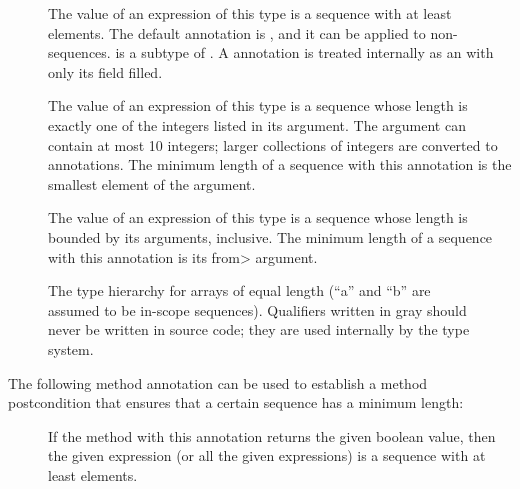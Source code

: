 \begin{description}
\item[]
  The value of an expression of this type is a sequence with at least
   elements.  The default annotation is
  , and it can be applied to non-sequences.
   is a subtype of .
  A  annotation is treated internally as an
   with only its
   field filled.
\item[]
  The value of an expression of this type is a sequence whose
  length is exactly one of the integers listed in its argument.
  The argument can contain at most 10 integers; larger collections of
  integers are converted to 
  annotations. The minimum length of a sequence with this annotation
  is the smallest element of the argument.
\item[]
  The value of an expression of this type is a sequence whose
  length is bounded by its arguments, inclusive.
  The minimum length of a sequence with this annotation is its \<from> argument.
\end{description}

\begin{figure}
\begin{center}
  \hfill
  \hfill
\end{center}
  \caption{The type hierarchy for arrays of equal length (``a'' and ``b'' are
    assumed to be in-scope sequences).  Qualifiers
    written in gray should never be written in source code; they are used
    internally by the type system.}
  \label{fig-index-array-types}
\end{figure}

The following method annotation can be used to establish a method postcondition
that ensures that a certain sequence has a minimum length:

\begin{description}
\item[]
  If the method with this annotation returns the given boolean value,
  then the given expression (or all the given expressions) is a sequence
  with at least  elements.
\end{description}

